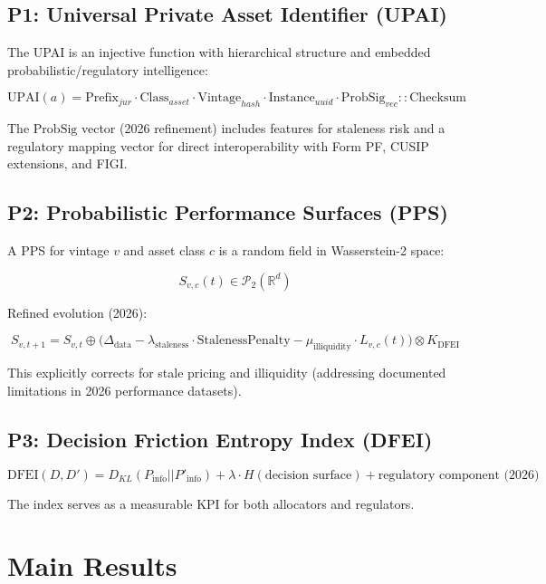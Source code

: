 \documentclass[11pt,a4paper]{article}
\begin{document}
\subsection{P1: Universal Private Asset Identifier (UPAI)}

The UPAI is an injective function with hierarchical structure and embedded probabilistic/regulatory intelligence:

\[
\mathrm{UPAI}(a) = \mathrm{Prefix}_{jur} \cdot \mathrm{Class}_{asset} \cdot \mathrm{Vintage}_{hash} \cdot \mathrm{Instance}_{uuid} \cdot \mathrm{ProbSig}_{vec} :: \mathrm{Checksum}
\]

The $\mathrm{ProbSig}$ vector (2026 refinement) includes features for staleness risk and a regulatory mapping vector for direct interoperability with Form PF, CUSIP extensions, and FIGI.

\subsection{P2: Probabilistic Performance Surfaces (PPS)}

A PPS for vintage $v$ and asset class $c$ is a random field in Wasserstein-2 space:

\[
S_{v,c}(t) \in \mathcal{P}_2(\mathbb{R}^d)
\]

Refined evolution (2026):

\[
S_{v,t+1} = S_{v,t} \oplus \bigl( \Delta_{\mathrm{data}} - \lambda_{\mathrm{staleness}} \cdot \mathrm{StalenessPenalty} - \mu_{\mathrm{illiquidity}} \cdot L_{v,c}(t) \bigr) \otimes K_{\mathrm{DFEI}}
\]

This explicitly corrects for stale pricing and illiquidity (addressing documented limitations in 2026 performance datasets).

\subsection{P3: Decision Friction Entropy Index (DFEI)}

\[
\mathrm{DFEI}(D, D') = D_{KL}(P_{\mathrm{info}} || P'_{\mathrm{info}}) + \lambda \cdot H(\text{decision surface}) + \text{regulatory component (2026)}
\]

The index serves as a measurable KPI for both allocators and regulators.

\section{Main Results}
\end{document}
